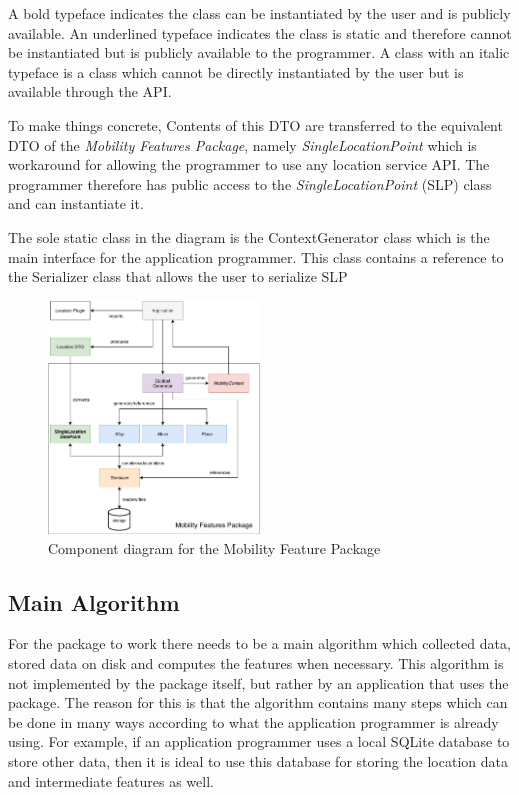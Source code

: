  A bold typeface indicates the class can be instantiated by the user and is publicly available. An underlined typeface indicates the class is static and therefore cannot be instantiated but is publicly available to the programmer. A class with an italic typeface is a class which cannot be directly instantiated by the user but is available through the API. 
 
 To make things concrete, Contents of this DTO are transferred to the equivalent DTO of the \textit{Mobility Features Package}, namely \textit{SingleLocationPoint} which is workaround for allowing the programmer to use any location service API. The programmer therefore has public access to the \textit{SingleLocationPoint} (SLP) class and can instantiate it.

The sole static class in the diagram is the ContextGenerator class which is the main interface for the application programmer. This class contains a reference to the Serializer class that allows the user to serialize SLP

\begin{figure}[h]
    \centering
    \includegraphics[width=0.5\textwidth]{images/diagrams/api-diagram.pdf}
    \caption{Component diagram for the Mobility Feature Package}
    \label{fig:component-diagram}
\end{figure}










\subsection{Main Algorithm}
For the package to work there needs to be a main algorithm which collected data, stored data on disk and computes the features when necessary. This algorithm is not implemented by the package itself, but rather by an application that uses the package. The reason for this is that the algorithm contains many steps which can be done in many ways according to what the application programmer is already using. For example, if an application programmer uses a local SQLite database to store other data, then it is ideal to use this database for storing the location data and intermediate features as well.

